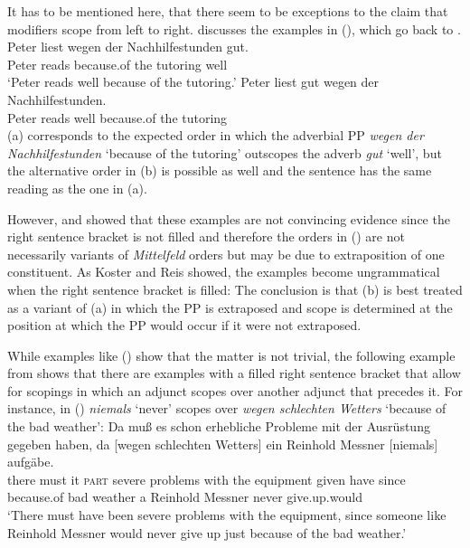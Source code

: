 It has to be mentioned here, that there seem to be exceptions to the claim that modifiers scope from
left to right. \citet*[]{Kasper94a} discusses the examples in (), which go back to \citet*[]{BV72}.
\eal
\label{bsp-peter-liest-gut-wegen}
\ex 
\gll Peter liest wegen der Nachhilfestunden gut.\\
     Peter reads because.of the tutoring well\\
\glt `Peter reads well because of the tutoring.'
\ex 
\gll Peter liest gut wegen der Nachhilfestunden.\\
     Peter reads well because.of the tutoring\\
\zl
(a) corresponds to the expected order in which the adverbial PP \emph{wegen der
  Nachhilfestunden} `because of the tutoring' outscopes the adverb \emph{gut} `well', but the alternative order in (b) is
possible as well and the sentence has the same reading as the one in (a).

  However, \citet[Section~6]{Koster75a} and \citet*[]{Reis80a} showed that these examples
  are not convincing evidence since the right sentence bracket is not filled and therefore the
  orders in () are not necessarily variants of \emph{Mittelfeld} orders but may be due to extraposition of
  one constituent. As Koster and Reis showed, the examples become ungrammatical when the right sentence
  bracket is filled:
\eal
{}
\zl
The conclusion is that (b) is best treated as a variant of (a) in which the PP is
extraposed and scope is determined at the position at which the PP would occur if it were not extraposed.

While examples like () show that the matter is not trivial, the following example from \citet[]{Crysmann2004a} shows that there are examples with a filled right sentence bracket that allow
for scopings in which an adjunct scopes over another adjunct that precedes it. For instance, in
() \emph{niemals} `never' scopes over \emph{wegen schlechten Wetters} `because of the bad weather':
\ea
\gll Da muß es schon erhebliche Probleme mit der Ausrüstung gegeben haben, da [wegen
  schlechten  Wetters] ein Reinhold Messner [niemals] aufgäbe.\\
     there must it \textsc{part} severe problems with the equipment given have since \hphantom{[}because.of bad weather a Reinhold Messner \hphantom{[}never give.up.would\\
\glt `There must have been severe problems with the equipment, since someone like Reinhold Messner
would never give up just because of the bad weather.'
\z

